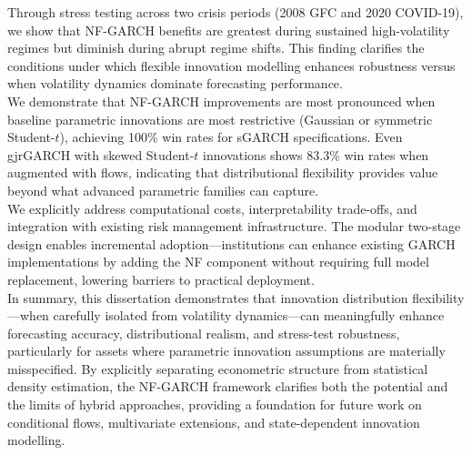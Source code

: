 \documentclass[oneside,12pt]{CUEDthesisPSnPDF}
\begin{document}
Through stress testing across two crisis periods (2008 GFC and 2020 COVID-19), we show that NF-GARCH benefits are greatest during sustained high-volatility regimes but diminish during abrupt regime shifts. This finding clarifies the conditions under which flexible innovation modelling enhances robustness versus when volatility dynamics dominate forecasting performance.\\
    
We demonstrate that NF-GARCH improvements are most pronounced when baseline parametric innovations are most restrictive (Gaussian or symmetric Student-$t$), achieving 100\% win rates for sGARCH specifications. Even gjrGARCH with skewed Student-$t$ innovations shows 83.3\% win rates when augmented with flows, indicating that distributional flexibility provides value beyond what advanced parametric families can capture.\\
    
We explicitly address computational costs, interpretability trade-offs, and integration with existing risk management infrastructure. The modular two-stage design enables incremental adoption—institutions can enhance existing GARCH implementations by adding the NF component without requiring full model replacement, lowering barriers to practical deployment.\\
    
In summary, this dissertation demonstrates that innovation distribution flexibility—when carefully isolated from volatility dynamics—can meaningfully enhance forecasting accuracy, distributional realism, and stress-test robustness, particularly for assets where parametric innovation assumptions are materially misspecified. By explicitly separating econometric structure from statistical density estimation, the NF-GARCH framework clarifies both the potential and the limits of hybrid approaches, providing a foundation for future work on conditional flows, multivariate extensions, and state-dependent innovation modelling.\\

\end{document}
